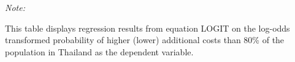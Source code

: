 \begin{table}[htbp!]
\begin{adjustbox}{width = 1\textwidth, max height = 0.95\textheight, center}
\begin{threeparttable}[b]
         \begin{tablenotes}\item \medskip \textit{Note:}
            \item This table displays regression results from equation LOGIT on the log-odds transformed probability of higher (lower) additional costs than 80\% of the population in Thailand as the dependent variable. 
         \end{tablenotes}
      \end{threeparttable}
   \end{adjustbox}
\end{table}


